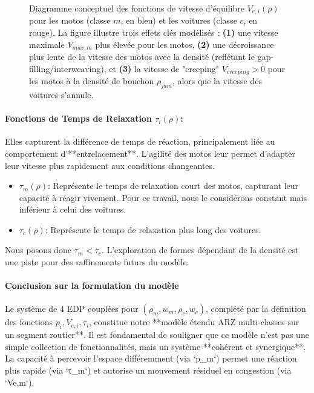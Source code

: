 \begin{figure}[h!]
    \centering
    \caption{Diagramme conceptuel des fonctions de vitesse d'équilibre \(V_{e,i}(\rho)\) pour les motos (classe \(m\), en bleu) et les voitures (classe \(c\), en rouge). La figure illustre trois effets clés modélisés : \textbf{(1)} une vitesse maximale \(V_{max,m}\) plus élevée pour les motos, \textbf{(2)} une décroissance plus lente de la vitesse des motos avec la densité (reflétant le gap-filling/interweaving), et \textbf{(3)} la vitesse de "creeping" \(V_{creeping} > 0\) pour les motos à la densité de bouchon \(\rho_{jam}\), alors que la vitesse des voitures s'annule.}
    \label{fig:conceptual_ve}
\end{figure}


\paragraph{Fonctions de Temps de Relaxation \( \tau_i(\rho) \):}
Elles capturent la différence de temps de réaction, principalement liée au comportement d'**entrelacement**. L'agilité des motos leur permet d'adapter leur vitesse plus rapidement aux conditions changeantes.
\begin{itemize}
    \item \( \tau_m(\rho) \): Représente le temps de relaxation court des motos, capturant leur capacité à réagir vivement. Pour ce travail, nous le considérons constant mais inférieur à celui des voitures.
    \item \( \tau_c(\rho) \): Représente le temps de relaxation plus long des voitures.
\end{itemize}
Nous posons donc \( \tau_m < \tau_c \). L'exploration de formes dépendant de la densité est une piste pour des raffinements futurs du modèle.

\paragraph{Conclusion sur la formulation du modèle}
Le système de 4 EDP couplées pour \((\rho_m, w_m, \rho_c, w_c)\), complété par la définition des fonctions \(p_i, V_{e,i}, \tau_i\), constitue notre **modèle étendu ARZ multi-classes sur un segment routier**. Il est fondamental de souligner que ce modèle n'est pas une simple collection de fonctionnalités, mais un système **cohérent et synergique**. La capacité à percevoir l'espace différemment (via `p_m`) permet une réaction plus rapide (via `τ_m`) et autorise un mouvement résiduel en congestion (via `Ve,m`).

